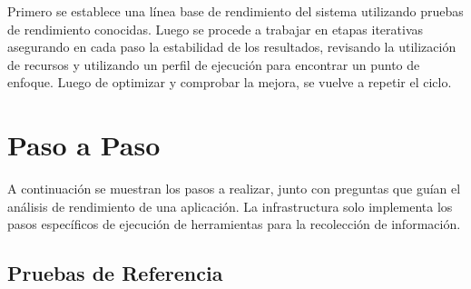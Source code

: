 \documentclass[a4paper]{report}
\begin{document}
Primero se establece una línea base de rendimiento del sistema utilizando pruebas de rendimiento conocidas.
Luego se procede a trabajar en etapas iterativas asegurando en cada paso la estabilidad de los resultados, revisando la utilización de recursos y utilizando un perfil de ejecución para encontrar un punto de enfoque. Luego de optimizar y comprobar la mejora, se vuelve a repetir el ciclo.

\section{Paso a Paso}

A continuación se muestran los pasos a realizar, junto con preguntas que guían el análisis de rendimiento de una aplicación.
La infrastructura solo implementa los pasos específicos de ejecución de herramientas para la recolección de información.

\subsection{Pruebas de Referencia}
\end{document}
